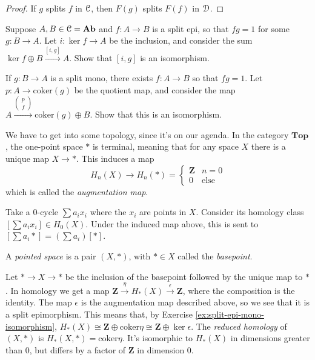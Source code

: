 \begin{proof}
If $g$ splits $f$ in $\mathcal C$, then $F(g)$ splits $F(f)$ in $\mathcal D$.
\end{proof}
\begin{exercise}\label{ex:split-epi-mono-isomorphism}
Suppose $A,B\in \mathcal C=\mathbf{Ab}$ and $f:A\to B$ is a split epi, so that $fg=1$ for some $g\colon B\rightarrow A$. Let $i\colon \ker f\to A$ be the inclusion, and consider the sum $\ker f\oplus B\xrightarrow{[i,g]} A$. Show that $[i,g]$ is an isomorphism.

If $g:B\to A$ is a split mono, there exists $f:A\to B$ so that $fg=1$. Let $p\colon A\rightarrow \mathrm{coker}(g)$ be the quotient map, and consider the map $A\xrightarrow{\begin{pmatrix}
p \\ f
\end{pmatrix}}\mathrm{coker}(g)\oplus B$. Show that this is an isomorphism.
\end{exercise}
We have to get into some topology, since it's on our agenda. In the category $\mathbf{Top}$, the one-point space $\ast$ is terminal, meaning that for any space $X$ there is a unique map $X\to\ast$. This induces a map
\[H_n(X)\to H_n(\ast)=\begin{cases}\mathbf{Z} & n=0\\
0 & \text{else}\end{cases}\]
which is called the \emph{augmentation map}.

Take a 0-cycle $\sum a_ix_i$ where the $x_i$ are points in $X$. Consider its homology class $\left[\sum a_ix_i\right]\in H_0(X)$. Under the induced map above, this is sent to $\left[\sum a_i\ast\right]=\left(\sum a_i\right)\left[\ast\right]$. 
\begin{definition}
A \emph{pointed space} is a pair $(X,\ast)$, with $\ast\in X$ called the \emph{basepoint}.
\end{definition}
Let $\ast\to X\to\ast$ be the inclusion of the basepoint followed by the unique map to $\ast$. In homology we get a map $\mathbf{Z}\xrightarrow{\eta} H_\ast(X)\xrightarrow{\epsilon}\mathbf{Z}$, where the composition is the identity. The map $\epsilon$ is the augmentation map described above, so we see that it is a split epimorphism. This means that, by Exercise \ref{ex:split-epi-mono-isomorphism}, $ H_\ast(X)\cong \mathbf{Z}\oplus\mathrm{coker}\eta \cong\mathbf{Z}\oplus\ker\epsilon$. The \emph{reduced homology} of $(X,\ast)$ is $ H_\ast(X,\ast)=\mathrm{coker}\eta$. It's isomorphic to $ H_\ast(X)$ in dimensions greater than $0$, but differs by a factor of $\mathbf{Z}$ in dimension $0$.



